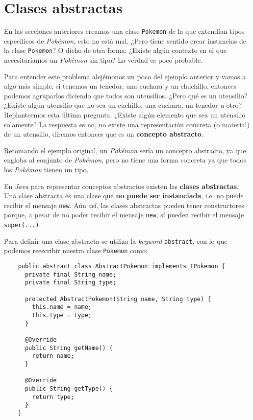 \section{Clases abstractas}
  En las secciones anteriores creamos una clase \texttt{Pokemon} de la que extendían tipos 
  específicos de \textit{Pokémon}, esto no está mal.
  ¿Pero tiene sentido crear instancias de la clase \texttt{Pokemon}?
  O dicho de otra forma: ¿Existe algún contexto en el que necesitaríamos un \textit{Pokémon} sin 
  tipo?
  La verdad es poco probable.

  Para entender este problema alejémonos un poco del ejemplo anterior y vamos a algo más simple, si
  tenemos un tenedor, una cuchara y un chuchillo, entonces podemos agruparlos diciendo que todos son 
  utensilios.
  ¿Pero qué es un utensilio?
  ¿Existe algún utensilio que no sea un cuchillo, una cuchara, un tenedor u otro?
  Replanteemos esta última pregunta: ¿Existe algún elemento que sea un utensilio solamente?
  La respuesta es no, no existe una representación concreta (o material) de un utensilio, diremos
  entonces que es un \textbf{concepto abstracto}.

  Retomando el ejemplo original, un \textit{Pokémon} sería un concepto abstracto, ya que engloba al
  conjunto de \textit{Pokémon}, pero no tiene una forma concreta ya que todos los \textit{Pokémon}
  tienen un tipo.

  En \textit{Java} para representar conceptos abstractos existen las \textbf{clases abstractas}.
  Una clase abstracta es una clase que \textbf{no puede ser instanciada}, i.e. no puede recibir el
  mensaje \texttt{new}.
  Aún así, las clases abstractas pueden tener constructores porque, a pesar de no poder recibir el
  mensaje \texttt{new}, sí pueden recibir el mensaje \texttt{super(...)}.

  Para definir una clase abstracta se utiliza la \textit{keyword} \texttt{abstract}, con 
  lo que podemos reescribir nuestra clase \texttt{Pokemon} como:

  \begin{verbatim}
    public abstract class AbstractPokemon implements IPokemon {
      private final String name;
      private final String type;

      protected AbstractPokemon(String name, String type) {
        this.name = name;
        this.type = type;
      }

      @Override
      public String getName() {
        return name;
      }

      @Override
      public String getType() {
        return type;
      }
    }
  \end{verbatim}
%
